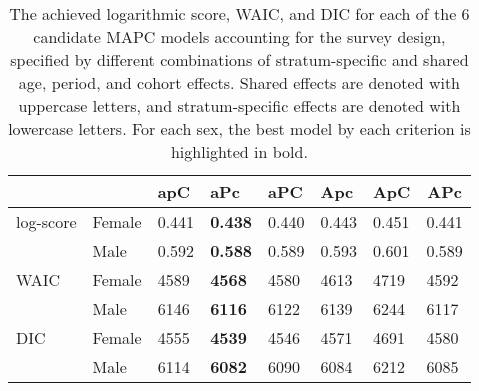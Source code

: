 \begin{table}[h!]
\centering
\begingroup\footnotesize{}

\begin{tabularx}{\textwidth}{llXXXXXX}
\hline
 &  & apC & aPc & aPC & Apc & ApC & \multicolumn{1}{c}{APc} \\ 
\hline
\nopagebreak log-score & \nopagebreak Female  & 0.441 & \textbf{ 0.438 } & 0.440 & 0.443 & 0.451 & 0.441 \\
 & \nopagebreak Male  & 0.592 & \textbf{ 0.588 } & 0.589 & 0.593 & 0.601 & 0.589 \\
\rule{0pt}{0.9\normalbaselineskip}WAIC & \nopagebreak Female  & 4589 & \textbf{ 4568 } & 4580 & 4613 & 4719 & 4592 \\
 & \nopagebreak Male  & 6146 & \textbf{ 6116 } & 6122 & 6139 & 6244 & 6117 \\
\rule{0pt}{0.9\normalbaselineskip}DIC & \nopagebreak Female  & 4555 & \textbf{ 4539 } & 4546 & 4571 & 4691 & 4580 \\
 & \nopagebreak Male  & 6114 & \textbf{ 6082 } & 6090 & 6084 & 6212 & 6085 \\
\hline 
\end{tabularx}\endgroup
 \caption{The achieved logarithmic score, WAIC, and DIC for each of the 6 candidate MAPC models accounting for the survey design, specified by different combinations of stratum-specific and shared age, period, and cohort effects. Shared effects are denoted with uppercase letters, and stratum-specific effects are denoted with lowercase letters. For each sex, the best model by each criterion is highlighted in bold.} \label{fig:model_selection_survey}


\end{table}